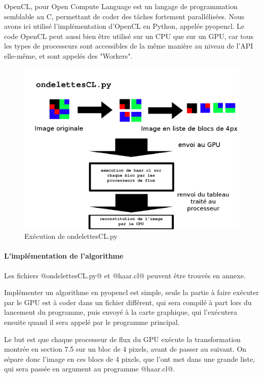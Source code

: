 OpenCL, pour Open Compute Language est un langage de programmation semblable au C, permettant de coder des tâches fortement parallélisées. Nous avons ici utilisé l'implémentation d'OpenCL en Python, appelée pyopencl. Le code OpenCL peut aussi bien être utilisé sur un CPU que sur un GPU, car tous les types de processeurs sont accessibles de la même manière au niveau de l'API elle-même, et sont appelés des "Workers".

\begin{figure}[!h]
\centering
\includegraphics[scale=0.4]{images/haarcl.png}
\caption{Exécution de ondelettesCL.py}
\label{haarcl}
\end{figure}

\clearpage


\paragraph{L'implémentation de l'algorithme}

Les fichiers @ondelettesCL.py@ et @haar.cl@ peuvent être trouvés en annexe.

Implémenter un algorithme en pyopencl est simple, seule la partie à faire exécuter par le GPU est à coder dans un fichier différent, qui sera compilé à part lors du lancement du programme, puis envoyé à la carte graphique, qui l'exécutera ensuite quand il sera appelé par le programme principal. 

Le but est que chaque processeur de flux du GPU exécute la transformation montrée en section 7.5 sur un bloc de 4 pixels, avant de passer au suivant. On sépare donc l'image en ces blocs de 4 pixels, que l'ont met dans une grande liste, qui sera passée en argument au programme @haar.cl@.


